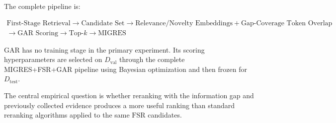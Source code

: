 \documentclass[11pt,a4paper]{article}
\begin{document}
The complete pipeline is:

\[
\boxed{
\begin{array}{c}
\text{First-Stage Retrieval}
\rightarrow
\text{Candidate Set}
\rightarrow
\text{Relevance/Novelty Embeddings}
+
\text{Gap-Coverage Token Overlap}
\\
\rightarrow
\text{GAR Scoring}
\rightarrow
\text{Top-}k
\rightarrow
\text{MIGRES}
\end{array}
}
\]

GAR has no training stage in the primary experiment. Its scoring hyperparameters are selected on $D_{\mathrm{val}}$ through the complete MIGRES+FSR+GAR pipeline using Bayesian optimization and then frozen for $D_{\mathrm{test}}$.

The central empirical question is whether reranking with the information gap and previously collected evidence produces a more useful ranking than standard reranking algorithms applied to the same $\mathrm{FSR}$ candidates.



\end{document}

